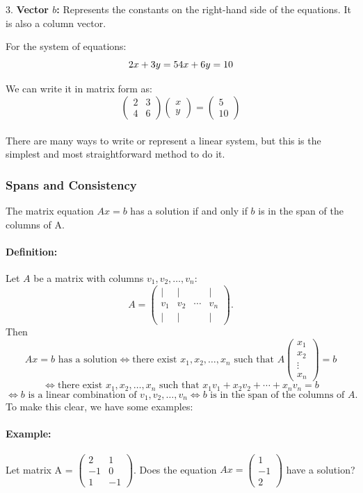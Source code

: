 \documentclass[a4paper,12pt]{article}
\begin{document}
3. \textbf{Vector \( b \):} Represents the constants on the right-hand side of the equations. It is also a column vector.

For the system of equations:
\[
2x + 3y = 5 \\
4x + 6y = 10
\]

We can write it in matrix form as:
\[
\begin{pmatrix}
2 & 3 \\
4 & 6
\end{pmatrix}
\begin{pmatrix}
x \\
y
\end{pmatrix}
=
\begin{pmatrix}
5 \\
10
\end{pmatrix}
\]
\\
There are many ways to write or represent a linear system, but this is the simplest and most straightforward method to do it.

\subsubsection{Spans and Consistency} The matrix equation \(Ax = b\) has a solution if and only if \(b\) is in the span of the columns of A.
\paragraph{Definition:}Let \( A \) be a matrix with columns \( v_1, v_2, \dots, v_n \):
\[
A =
\begin{pmatrix}
\vert & \vert & & \vert \\
v_1 & v_2 & \cdots & v_n \\
\vert & \vert & & \vert
\end{pmatrix}.
\]
Then
\[
Ax = b \text{ has a solution} \iff \text{there exist } x_1, x_2, \dots, x_n \text{ such that } 
A
\begin{pmatrix}
x_1 \\
x_2 \\
\vdots \\
x_n
\end{pmatrix}
= b
\]
\[
\iff \text{there exist } x_1, x_2, \dots, x_n \text{ such that } x_1v_1 + x_2v_2 + \cdots + x_nv_n = b
\]
\[
\iff b \text{ is a linear combination of } v_1, v_2, \dots, v_n 
\iff b \text{ is in the span of the columns of } A.
\]
To make this clear, we have some examples:

\paragraph{Example:}Let matrix A = $\begin{pmatrix}
    2&1 \\
    -1&0 \\
    1&-1
\end{pmatrix}$. Does the equation \(Ax = \begin{pmatrix}
    1\\-1\\2
\end{pmatrix}\) have a solution?
\end{document}

